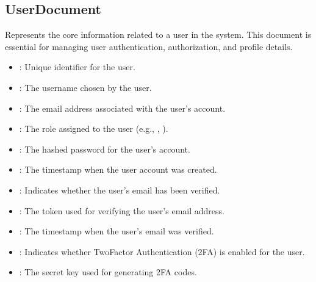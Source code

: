 \documentclass[letterpaper,10pt,english]{sphinxmanual}
\begin{document}
\subsection{UserDocument}
\label{\detokenize{crm_system/authorization_service:userdocument}}
\sphinxAtStartPar
Represents the core information related to a user in the system. This document is essential for managing user authentication, authorization, and profile details.
\begin{itemize}
\item {} 
\sphinxAtStartPar
{}: 
\sphinxhyphen{} Unique identifier for the user.

\item {} 
\sphinxAtStartPar
{}: 
\sphinxhyphen{} The username chosen by the user.

\item {} 
\sphinxAtStartPar
{}: 
\sphinxhyphen{} The email address associated with the user’s account.

\item {} 
\sphinxAtStartPar
{}: 
\sphinxhyphen{} The role assigned to the user (e.g., , ).

\item {} 
\sphinxAtStartPar
{}: 
\sphinxhyphen{} The hashed password for the user’s account.

\item {} 
\sphinxAtStartPar
{}: 
\sphinxhyphen{} The timestamp when the user account was created.

\item {} 
\sphinxAtStartPar
{}: 
\sphinxhyphen{} Indicates whether the user’s email has been verified.

\item {} 
\sphinxAtStartPar
{}: 
\sphinxhyphen{} The token used for verifying the user’s email address.

\item {} 
\sphinxAtStartPar
{}: 
\sphinxhyphen{} The timestamp when the user’s email was verified.

\item {} 
\sphinxAtStartPar
{}: 
\sphinxhyphen{} Indicates whether Two\sphinxhyphen{}Factor Authentication (2FA) is enabled for the user.

\item {} 
\sphinxAtStartPar
{}: 
\sphinxhyphen{} The secret key used for generating 2FA codes.

\end{itemize}
\end{document}
